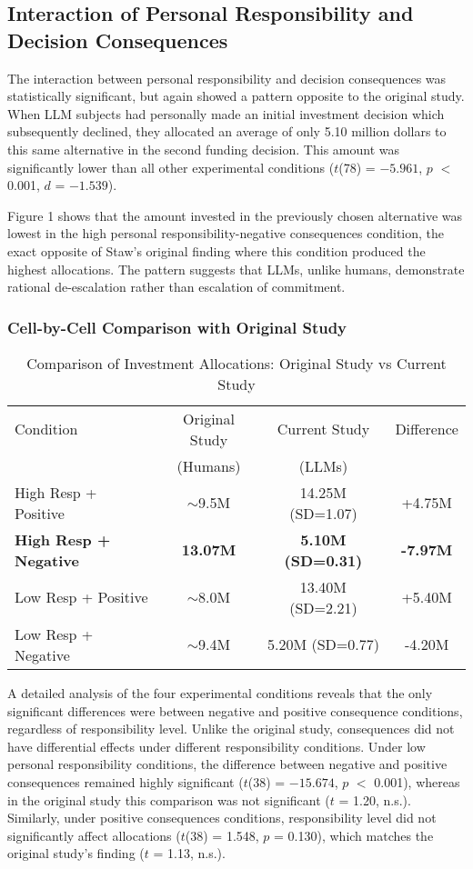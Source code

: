 \documentclass{article}
\begin{document}
\subsection{Interaction of Personal Responsibility and Decision Consequences}

The interaction between personal responsibility and decision consequences was statistically significant, but again showed a pattern opposite to the original study. When LLM subjects had personally made an initial investment decision which subsequently declined, they allocated an average of only 5.10 million dollars to this same alternative in the second funding decision. This amount was significantly lower than all other experimental conditions ($t$(78) = $-5.961$, $p$ $<$ 0.001, $d$ = $-1.539$).

Figure 1 shows that the amount invested in the previously chosen alternative was lowest in the high personal responsibility-negative consequences condition, the exact opposite of Staw's original finding where this condition produced the highest allocations. The pattern suggests that LLMs, unlike humans, demonstrate rational de-escalation rather than escalation of commitment.

\subsubsection{Cell-by-Cell Comparison with Original Study}

\begin{table}[htbp]
\centering
\caption{Comparison of Investment Allocations: Original Study vs Current Study}
\begin{tabular}{lccc}
\hline
Condition & Original Study & Current Study & Difference \\
 & (Humans) & (LLMs) & \\
\hline
High Resp + Positive & $\sim$9.5M & 14.25M (SD=1.07) & +4.75M \\
\textbf{High Resp + Negative} & \textbf{13.07M} & \textbf{5.10M (SD=0.31)} & \textbf{-7.97M} \\
Low Resp + Positive & $\sim$8.0M & 13.40M (SD=2.21) & +5.40M \\
Low Resp + Negative & $\sim$9.4M & 5.20M (SD=0.77) & -4.20M \\
\hline
\end{tabular}
\end{table}

A detailed analysis of the four experimental conditions reveals that the only significant differences were between negative and positive consequence conditions, regardless of responsibility level. Unlike the original study, consequences did not have differential effects under different responsibility conditions. Under low personal responsibility conditions, the difference between negative and positive consequences remained highly significant ($t$(38) = $-15.674$, $p$ $<$ 0.001), whereas in the original study this comparison was not significant ($t$ = 1.20, n.s.). Similarly, under positive consequences conditions, responsibility level did not significantly affect allocations ($t$(38) = 1.548, $p$ = 0.130), which matches the original study's finding ($t$ = 1.13, n.s.).
\end{document}
